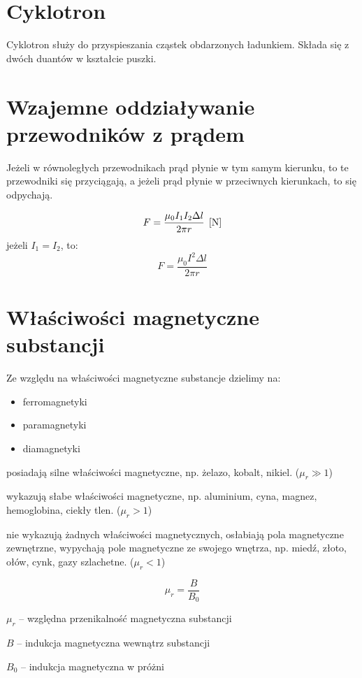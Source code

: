 \section{Cyklotron}
Cyklotron służy do przyspieszania cząstek obdarzonych ładunkiem. Składa się z dwóch duantów w
kształcie puszki.

\section{Wzajemne oddziaływanie przewodników z prądem}
Jeżeli w równoległych przewodnikach prąd płynie w tym samym kierunku, to te przewodniki się
przyciągają, a jeżeli prąd płynie w przeciwnych kierunkach, to się odpychają.

\begin{equation*}
  F = \frac{\mu_0 I_1 I_2 \Delta l}{2\pi r} \;\left[\mathrm{N}\right]
\end{equation*}
jeżeli $I_1 = I_2$, to:
\begin{equation*}
  F = \frac{\mu_0 I^2 \Delta l}{2\pi r}
\end{equation*}

\section{Właściwości magnetyczne substancji}
Ze względu na właściwości magnetyczne substancje dzielimy na:
\begin{itemize}
  \item ferromagnetyki
  \item paramagnetyki
  \item diamagnetyki
\end{itemize}

 posiadają silne właściwości magnetyczne, np. żelazo, kobalt, nikiel. ($\mu_r \gg 1$)

 wykazują słabe właściwości magnetyczne, np. aluminium, cyna, magnez,
hemoglobina, ciekły tlen. ($\mu_r > 1$)

 nie wykazują żadnych właściwości magnetycznych, osłabiają pola magnetyczne
zewnętrzne, wypychają pole magnetyczne ze swojego wnętrza, np. miedź, złoto, ołów, cynk, gazy
szlachetne. ($\mu_r <1$)

\begin{equation*}
  \mu_r = \frac{B}{B_0}
\end{equation*}
\begin{symbols}
  \item $\mu_r$ -- względna przenikalność magnetyczna substancji
  \item $B$ -- indukcja magnetyczna wewnątrz substancji
  \item $B_0$  -- indukcja magnetyczna w próżni
\end{symbols}

